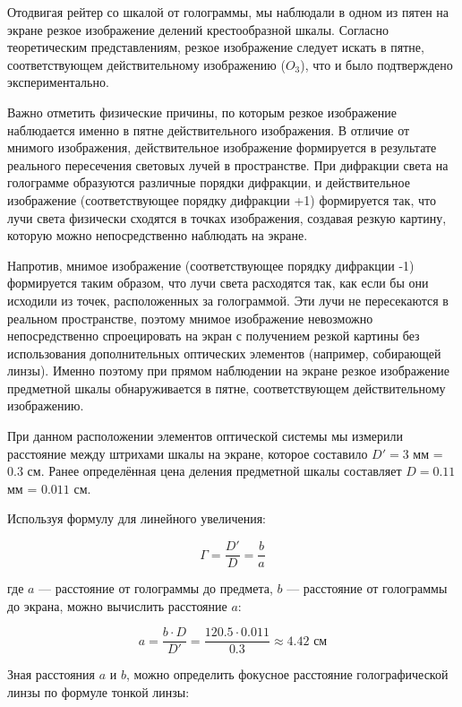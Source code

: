 Отодвигая рейтер со шкалой от голограммы, мы наблюдали в одном из пятен на экране резкое изображение делений крестообразной шкалы. Согласно теоретическим представлениям, резкое изображение следует искать в пятне, соответствующем действительному изображению ($O_3$), что и было подтверждено экспериментально.

Важно отметить физические причины, по которым резкое изображение наблюдается именно в пятне действительного изображения. В отличие от мнимого изображения, действительное изображение формируется в результате реального пересечения световых лучей в пространстве. При дифракции света на голограмме образуются различные порядки дифракции, и действительное изображение (соответствующее порядку дифракции +1) формируется так, что лучи света физически сходятся в точках изображения, создавая резкую картину, которую можно непосредственно наблюдать на экране. 

Напротив, мнимое изображение (соответствующее порядку дифракции -1) формируется таким образом, что лучи света расходятся так, как если бы они исходили из точек, расположенных за голограммой. Эти лучи не пересекаются в реальном пространстве, поэтому мнимое изображение невозможно непосредственно спроецировать на экран с получением резкой картины без использования дополнительных оптических элементов (например, собирающей линзы). Именно поэтому при прямом наблюдении на экране резкое изображение предметной шкалы обнаруживается в пятне, соответствующем действительному изображению.

При данном расположении элементов оптической системы мы измерили расстояние между штрихами шкалы на экране, которое составило $D' = 3$ мм = $0.3$ см. Ранее определённая цена деления предметной шкалы составляет $D = 0.11$ мм = $0.011$ см.

Используя формулу для линейного увеличения:

\begin{equation}
    \Gamma = \frac{D'}{D} = \frac{b}{a} 
\end{equation}

где $a$ — расстояние от голограммы до предмета, $b$ — расстояние от голограммы до экрана, можно вычислить расстояние $a$:

\begin{equation}
    a = \frac{b \cdot D}{D'} = \frac{120.5 \cdot 0.011}{0.3} \approx 4.42 \text{ см}
\end{equation}

Зная расстояния $a$ и $b$, можно определить фокусное расстояние голографической линзы по формуле тонкой линзы:

